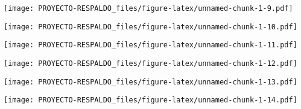 \documentclass[
]{article}
\newenvironment{Shaded}{\begin{snugshade}}{\end{snugshade}}
\newcommand{\CommentTok}[1]{\textcolor[rgb]{0.56,0.35,0.01}{\textit{#1}}}
\newcommand{\DataTypeTok}[1]{\textcolor[rgb]{0.13,0.29,0.53}{#1}}
\newcommand{\KeywordTok}[1]{\textcolor[rgb]{0.13,0.29,0.53}{\textbf{#1}}}
\newcommand{\NormalTok}[1]{#1}
\newcommand{\OperatorTok}[1]{\textcolor[rgb]{0.81,0.36,0.00}{\textbf{#1}}}
\newcommand{\StringTok}[1]{\textcolor[rgb]{0.31,0.60,0.02}{#1}}
\begin{document}
\texttt{[image: PROYECTO-RESPALDO\_files/figure-latex/unnamed-chunk-1-9.pdf]}

\begin{Shaded}
\end{Shaded}

\texttt{[image: PROYECTO-RESPALDO\_files/figure-latex/unnamed-chunk-1-10.pdf]}

\begin{Shaded}
\end{Shaded}

\texttt{[image: PROYECTO-RESPALDO\_files/figure-latex/unnamed-chunk-1-11.pdf]}

\begin{Shaded}
\end{Shaded}

\texttt{[image: PROYECTO-RESPALDO\_files/figure-latex/unnamed-chunk-1-12.pdf]}

\begin{Shaded}
\end{Shaded}

\texttt{[image: PROYECTO-RESPALDO\_files/figure-latex/unnamed-chunk-1-13.pdf]}

\begin{Shaded}
\end{Shaded}

\texttt{[image: PROYECTO-RESPALDO\_files/figure-latex/unnamed-chunk-1-14.pdf]}

\begin{Shaded}
\end{Shaded}
\end{document}
